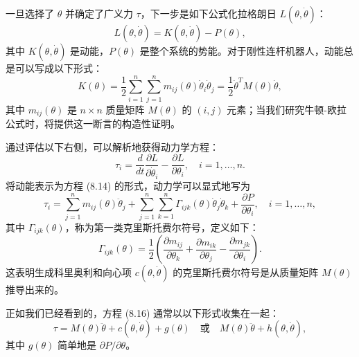 \documentclass[12pt,a4paper]{article}
\begin{document}
一旦选择了 $\theta$ 并确定了广义力 $\tau$，下一步是如下公式化拉格朗日 $L(\theta, \dot{\theta})$：
\begin{equation}
L(\theta, \dot{\theta}) = K(\theta, \dot{\theta}) - P(\theta), \label{eq:8.13}
\end{equation}
其中 $K(\theta, \dot{\theta})$ 是动能，$P(\theta)$ 是整个系统的势能。对于刚性连杆机器人，动能总是可以写成以下形式：
\begin{equation}
K(\theta) = \frac{1}{2}\sum_{i=1}^{n}\sum_{j=1}^{n} m_{ij}(\theta)\dot{\theta}_i \dot{\theta}_j = \frac{1}{2}\dot{\theta}^T M(\theta)\dot{\theta}, \label{eq:8.14}
\end{equation}
其中 $m_{ij}(\theta)$ 是 $n \times n$ 质量矩阵 $M(\theta)$ 的 $(i, j)$ 元素；当我们研究牛顿-欧拉公式时，将提供这一断言的构造性证明。

通过评估以下右侧，可以解析地获得动力学方程：
\begin{equation}
\tau_i = \frac{d}{dt}\frac{\partial L}{\partial \dot{\theta}_i} - \frac{\partial L}{\partial \theta_i}, \quad i = 1, \ldots, n. \label{eq:8.15}
\end{equation}
将动能表示为方程 (8.14) 的形式，动力学可以显式地写为
\begin{equation}
\tau_i = \sum_{j=1}^{n} m_{ij}(\theta)\ddot{\theta}_j + \sum_{j=1}^{n}\sum_{k=1}^{n} \Gamma_{ijk}(\theta)\dot{\theta}_j \dot{\theta}_k + \frac{\partial P}{\partial \theta_i}, \quad i = 1, \ldots, n, \label{eq:8.16}
\end{equation}
其中 $\Gamma_{ijk}(\theta)$，称为第一类克里斯托费尔符号，定义如下：
\begin{equation}
\Gamma_{ijk}(\theta) = \frac{1}{2}\left(\frac{\partial m_{ij}}{\partial \theta_k} + \frac{\partial m_{ik}}{\partial \theta_j} - \frac{\partial m_{jk}}{\partial \theta_i}\right). \label{eq:8.17}
\end{equation}
这表明生成科里奥利和向心项 $c(\theta, \dot{\theta})$ 的克里斯托费尔符号是从质量矩阵 $M(\theta)$ 推导出来的。

正如我们已经看到的，方程 (8.16) 通常以以下形式收集在一起：
\begin{equation}
\tau = M(\theta)\ddot{\theta} + c(\theta, \dot{\theta}) + g(\theta) \quad \text{或} \quad M(\theta)\ddot{\theta} + h(\theta, \dot{\theta}),
\end{equation}
其中 $g(\theta)$ 简单地是 $\partial P/\partial \theta$。
\end{document}
